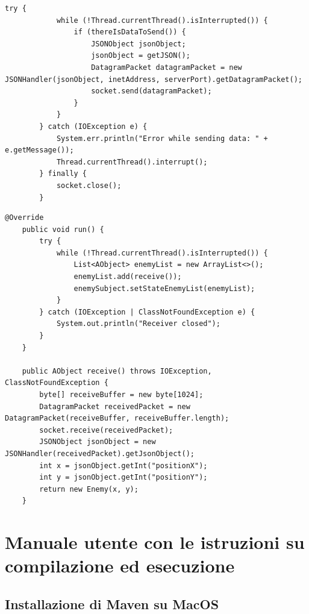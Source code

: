 \documentclass{article}
\begin{document}
\begin{lstlisting}[style=mystyle, caption={Client SenderThread}, label={lst:codice}]
try {
            while (!Thread.currentThread().isInterrupted()) {
                if (thereIsDataToSend()) {
                    JSONObject jsonObject;
                    jsonObject = getJSON();
                    DatagramPacket datagramPacket = new JSONHandler(jsonObject, inetAddress, serverPort).getDatagramPacket();
                    socket.send(datagramPacket);
                }
            }
        } catch (IOException e) {
            System.err.println("Error while sending data: " + e.getMessage());
            Thread.currentThread().interrupt();
        } finally {
            socket.close();
        }

\end{lstlisting}

\begin{lstlisting}[style=mystyle, caption={Client ReceiverThread}, label={lst:codice}]
@Override
    public void run() {
        try {
            while (!Thread.currentThread().isInterrupted()) {
                List<AObject> enemyList = new ArrayList<>();
                enemyList.add(receive());
                enemySubject.setStateEnemyList(enemyList);
            }
        } catch (IOException | ClassNotFoundException e) {
            System.out.println("Receiver closed");
        }
    }

    public AObject receive() throws IOException, ClassNotFoundException {
        byte[] receiveBuffer = new byte[1024];
        DatagramPacket receivedPacket = new DatagramPacket(receiveBuffer, receiveBuffer.length);
        socket.receive(receivedPacket);
        JSONObject jsonObject = new JSONHandler(receivedPacket).getJsonObject();
        int x = jsonObject.getInt("positionX");
        int y = jsonObject.getInt("positionY");
        return new Enemy(x, y);
    }

\end{lstlisting}


\pagebreak

\section{Manuale utente con le istruzioni su compilazione ed esecuzione}
\subsection{Installazione di Maven su MacOS}
\end{document}
